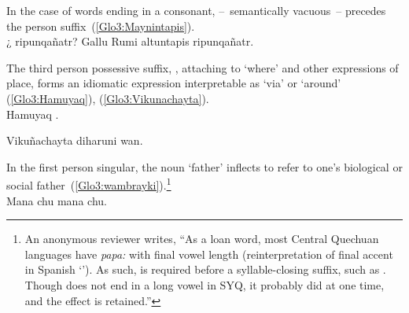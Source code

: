 {\noindent
In the case of words ending in a consonant,  --~semantically vacuous~-- precedes the person suffix~(\ref{Glo3:Maynintapis}).\\

%
{¿ ripunqañatr? Gallu Rumi altuntapis ripunqañatr.}%
{}%
{}{}%

\noindent
The third person possessive suffix, , attaching to  ‘where’ and other expressions of place, forms an idiomatic expression interpretable as ‘via’ or ‘around’ (\ref{Glo3:Hamuyaq}), (\ref{Glo3:Vikunachayta}).\\

%
{Hamuyaq .}%
{}%
{}{}%

%
{Vikuñachayta diharuni wan.}%
{}%
{}{}%

\noindent
In the first person singular, the noun  ‘father’ inflects  to refer to one’s biological or social father~(\ref{Glo3:wambrayki}).\footnote{An anonymous reviewer writes, “As a loan word, most Central Quechuan languages have \emph{papa:} with final vowel length (reinterpretation of final accent in Spanish ‘’). As such,  is required before a syllable-closing suffix, such as . Though  does not end in a long vowel in SYQ, it probably did at one time, and the effect is retained.”}\\

%
{Mana  chu mana  chu.}%
{}%
{}{}%

}
